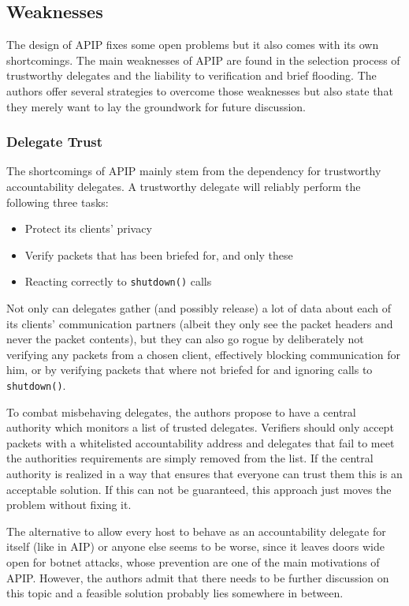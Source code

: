 \documentclass{acm_proc_article-sp}
\begin{document}
\subsection{Weaknesses}
The design of APIP fixes some open problems but it also comes with its own shortcomings. The main weaknesses of APIP are found in the selection process of trustworthy delegates and the liability to verification and brief flooding. The authors offer several strategies to overcome those weaknesses but also state that they merely want to lay the groundwork for future discussion.

\subsubsection{Delegate Trust}
The shortcomings of APIP mainly stem from the dependency for trustworthy accountability delegates. A trustworthy delegate will reliably perform the following three tasks:
\begin{itemize}
\item Protect its clients' privacy
\item Verify packets that has been briefed for, and only these
\item Reacting correctly to \texttt{shutdown()} calls 
\end{itemize}
Not only can delegates gather (and possibly release) a lot of data about each of its clients' communication partners (albeit they only see the packet headers and never the packet contents), but they can also go rogue by deliberately not verifying any packets from a chosen client, effectively blocking communication for him, or by verifying packets that where not briefed for and ignoring calls to \texttt{shutdown()}.

To combat misbehaving delegates, the authors propose to have a central authority which monitors a list of trusted delegates. Verifiers should only accept packets with a whitelisted accountability address and delegates that fail to meet the authorities requirements are simply removed from the list. If the central authority is realized in a way that ensures that everyone can trust them this is an acceptable solution. If this can not be guaranteed, this approach just moves the problem without fixing it.

The alternative to allow every host to behave as an accountability delegate for itself (like in AIP) or anyone else seems to be worse, since it leaves doors wide open for botnet attacks, whose prevention are one of the main motivations of APIP. However, the authors admit that there needs to be further discussion on this topic and a feasible solution probably lies somewhere in between.
\end{document}
